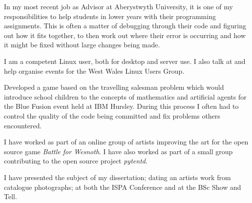 \documentclass[10pt,stdletter,dateno,sigleft]{newlfm} %
\begin{document}
\begin{newlfm}
In my most recent job as Advisor at Aberystwyth University, it is one of my 
responsibilities to help students in lower years with their programming 
assignments. This is often a matter of debugging through their code and 
figuring out how it fits together, to then work out where their error is
occurring and how it might be fixed without large changes being made.






I am a competent Linux user, both for desktop and server use. I also talk at 
and help organise events for the West Wales Linux Users Group.

Developed a game based on the travelling salesman problem which would introduce
school children to the concepts of mathematics and artificial agents for the
Blue Fusion event held at IBM Hursley. During this process I often had to 
control the quality of the code being committed and fix problems others 
encountered.

I have worked as part of an online group of artists improving the art for the
open source game \textit{Battle for Wesnoth}. I have also worked as part of a small 
group contributing to the open source project \textit{pytentd}.

I have presented the subject of my dissertation; dating an artists work from 
catalogue photographs; at both the ISPA Conference and at the BSc Show and 
Tell.


\end{newlfm}
\end{document}
